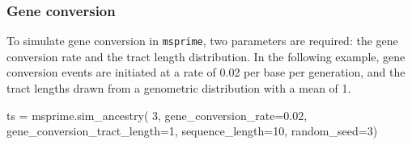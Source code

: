 \documentclass[graybox]{svmult}
\newcommand{\msprime}[0]{\texttt{msprime}}
\begin{document}





\subsubsection{Gene conversion}\label{gene-conversion}
To simulate gene conversion in \msprime,
two parameters are required: the gene conversion rate and the tract length distribution.
In the following example, gene conversion events are initiated at a rate of
0.02 per base per generation, and the tract lengths drawn from a
genometric distribution with a mean of 1.
\begin{pythoncode}
ts = msprime.sim_ancestry(
    3, gene_conversion_rate=0.02, gene_conversion_tract_length=1,
    sequence_length=10, random_seed=3)
\end{pythoncode}
\end{document}
